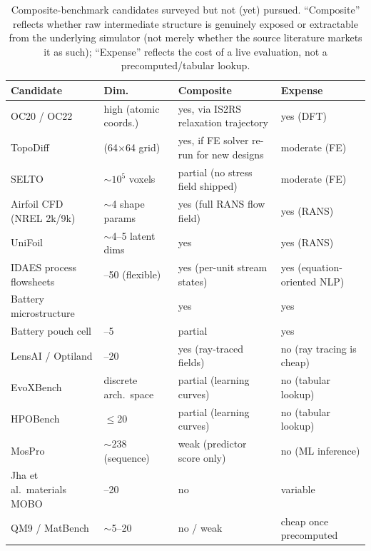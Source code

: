 \documentclass[11pt]{article}
\begin{document}
\begin{table}[h]
\centering
\small
\caption{Composite-benchmark candidates surveyed but not (yet) pursued. ``Composite'' reflects whether raw intermediate structure is genuinely exposed or extractable from the underlying simulator (not merely whether the source literature markets it as such); ``Expense'' reflects the cost of a live evaluation, not a precomputed/tabular lookup.}
\label{tab:candidate-survey}
\begin{tabularx}{\textwidth}{@{}>{\raggedright\arraybackslash}p{3.3cm}>{\raggedright\arraybackslash}p{1.9cm}>{\raggedright\arraybackslash}p{3.4cm}>{\raggedright\arraybackslash}X@{}}
\toprule
Candidate & Dim.\ & Composite & Expense \\
\midrule
OC20 / OC22 \citep{chanussot2021oc20,tran2022oc22} & high (atomic coords.) & yes, via IS2RS relaxation trajectory & yes (DFT) \\
TopoDiff \citep{maze2023topodiff} & 4096 (64$\times$64 grid) & yes, if FE solver re-run for new designs & moderate (FE) \\
SELTO \citep{dittmer2022selto} & $\sim$$10^5$ voxels & partial (no stress field shipped) & moderate (FE) \\
Airfoil CFD (NREL 2k/9k) & $\sim$4 shape params & yes (full RANS flow field) & yes (RANS) \\
UniFoil & $\sim$4--5 latent dims & yes & yes (RANS) \\
IDAES process flowsheets & 5--50 (flexible) & yes (per-unit stream states) & yes (equation-oriented NLP) \\
Battery microstructure \citep{kench2024battery} & 7 & yes & yes \\
Battery pouch cell \citep{ma2024battery} & 4--5 & partial & yes \\
LensAI / Optiland \citep{kramer2024lensai,kramer2024optiland} & 5--20 & yes (ray-traced fields) & no (ray tracing is cheap) \\
EvoXBench \citep{lu2023evoxbench} & discrete arch.\ space & partial (learning curves) & no (tabular lookup) \\
HPOBench \citep{eggensperger2021hpobench} & $\le$20 & partial (learning curves) & no (tabular lookup) \\
MosPro \citep{luo2025mospro} & $\sim$238 (sequence) & weak (predictor score only) & no (ML inference) \\
Jha et al.\ materials MOBO \citep{jha2018materials} & 5--20 & no & variable \\
QM9 \citep{ramakrishnan2014qm9} / MatBench \citep{dunn2020matbench} & $\sim$5--20 & no / weak & cheap once precomputed \\
\bottomrule
\end{tabularx}
\end{table}
\end{document}
